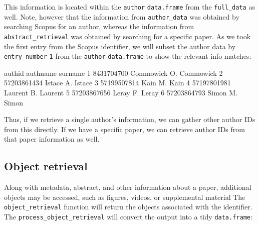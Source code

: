 This information is located within the \texttt{author}
\texttt{data.frame} from the \texttt{full\_data} as well. Note, however
that the information from \texttt{author\_data} was obtained by
searching Scopus for an author, whereas the information from
\texttt{abstract\_retrieval} was obtained by searching for a specific
paper. As we took the first entry from the Scopus identifier, we will
subset the author data by \texttt{entry\_number} \texttt{1} from the
\texttt{author} \texttt{data.frame} to show the relevant info matches:

\begin{Schunk}
\begin{Soutput}
       authid     authname   surname
1  8431704700 Commowick O. Commowick
2 57203861434    Istace A.    Istace
3 57199507814      Kain M.      Kain
4 57197801981   Laurent B.   Laurent
5 57203867656     Leray F.     Leray
6 57203864793     Simon M.     Simon
\end{Soutput}
\end{Schunk}

Thus, if we retrieve a single author's information, we can gather other
author IDs from this directly. If we have a specific paper, we can
retrieve author IDs from that paper information as well.

\hypertarget{object-retrieval}{%
\subsection{Object retrieval}\label{object-retrieval}}

Along with metadata, abstract, and other information about a paper,
additional objects may be accessed, such as figures, videos, or
supplemental material The \texttt{object\_retrieval} function will
return the objects associated with the identifier. The
\texttt{process\_object\_retrieval} will convert the output into a tidy
\texttt{data.frame}:


